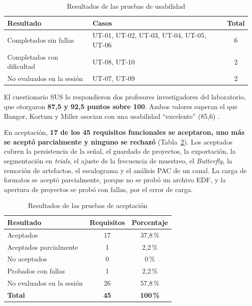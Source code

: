 \documentclass[12pt,letterpaper,oneside]{article}
\begin{document}
\begin{table}[H]
\centering
\scriptsize
\renewcommand{\arraystretch}{1.3}
\begin{tabularx}{\textwidth}{|>{\raggedright\arraybackslash}X|>{\raggedright\arraybackslash}X|c|}
\hline
\textbf{Resultado} & \textbf{Casos} & \textbf{Total} \\
\hline
Completados sin fallas & UT-01, UT-02, UT-03, UT-04, UT-05, UT-06 & 6 \\
\hline
Completados con dificultad & UT-08, UT-10 & 2 \\
\hline
No evaluados en la sesión & UT-07, UT-09 & 2 \\
\hline
\end{tabularx}
\caption{Resultados de las pruebas de usabilidad}
\label{tab:resultados_usabilidad}
\end{table}

El cuestionario SUS lo respondieron dos profesores investigadores del laboratorio, que otorgaron \textbf{87,5 y 92,5 puntos sobre 100}. Ambos valores superan el que Bangor, Kortum y Miller asocian con una usabilidad ``excelente'' (85,6) \cite{bangor2009}.

En aceptación, \textbf{17 de los 45 requisitos funcionales se aceptaron, uno más se aceptó parcialmente y ninguno se rechazó} (Tabla~\ref{tab:resultados_aceptacion}). Los aceptados cubren la persistencia de la señal, el guardado de proyectos, la exportación, la segmentación en \textit{trials}, el ajuste de la frecuencia de muestreo, el \textit{Butterfly}, la remoción de artefactos, el escalograma y el análisis PAC de un canal. La carga de formatos se aceptó parcialmente, porque no se probó un archivo EDF, y la apertura de proyectos se probó con fallas, por el error de carga.

\begin{table}[H]
\centering
\scriptsize
\renewcommand{\arraystretch}{1.3}
\begin{tabularx}{\textwidth}{|>{\raggedright\arraybackslash}X|c|c|}
\hline
\textbf{Resultado} & \textbf{Requisitos} & \textbf{Porcentaje} \\
\hline
Aceptados & 17 & 37,8\,\% \\
\hline
Aceptados parcialmente & 1 & 2,2\,\% \\
\hline
No aceptados & 0 & 0\,\% \\
\hline
Probados con fallas & 1 & 2,2\,\% \\
\hline
No evaluados en la sesión & 26 & 57,8\,\% \\
\hline
\textbf{Total} & \textbf{45} & \textbf{100\,\%} \\
\hline
\end{tabularx}
\caption{Resultados de las pruebas de aceptación}
\label{tab:resultados_aceptacion}
\end{table}
\end{document}
